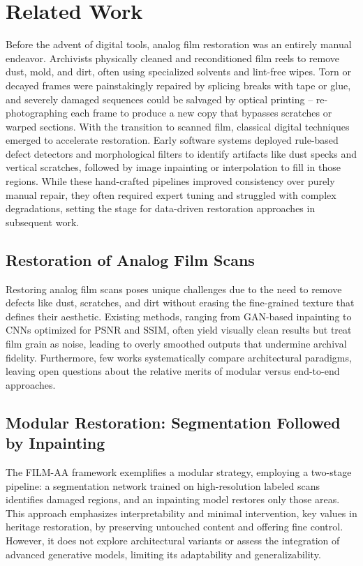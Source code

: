\documentclass[10pt,a4paper,twocolumn,twoside]{article}
\begin{document}
\section{Related Work}
Before the advent of digital tools, analog film restoration was an entirely manual endeavor. Archivists physically cleaned and reconditioned film reels to remove dust, mold, and dirt, often using specialized solvents and lint-free wipes. Torn or decayed frames were painstakingly repaired by splicing breaks with tape or glue, and severely damaged sequences could be salvaged by optical printing – re-photographing each frame to produce a new copy that bypasses scratches or warped sections. With the transition to scanned film, classical digital techniques emerged to accelerate restoration. Early software systems deployed rule-based defect detectors and morphological filters to identify artifacts like dust specks and vertical scratches, followed by image inpainting or interpolation to fill in those regions. While these hand-crafted pipelines improved consistency over purely manual repair, they often required expert tuning and struggled with complex degradations, setting the stage for data-driven restoration approaches in subsequent work. \cite{croci2015advanced}

\subsection{Restoration of Analog Film Scans}
Restoring analog film scans poses unique challenges due to the need to remove defects like dust, scratches, and dirt without erasing the fine-grained texture that defines their aesthetic. Existing methods, ranging from GAN-based inpainting \cite{gan} to CNNs optimized for PSNR and SSIM, often yield visually clean results but treat film grain as noise, leading to overly smoothed outputs that undermine archival fidelity. Furthermore, few works systematically compare architectural paradigms, leaving open questions about the relative merits of modular versus end-to-end approaches. \cite{survey} \\ 
\subsection{Modular Restoration: Segmentation Followed by Inpainting}
The FILM-AA framework exemplifies a modular strategy, employing a two-stage pipeline: a segmentation network trained on high-resolution labeled scans identifies damaged regions, and an inpainting model restores only those areas. This approach emphasizes interpretability and minimal intervention, key values in heritage restoration, by preserving untouched content and offering fine control. However, it does not explore architectural variants or assess the integration of advanced generative models, limiting its adaptability and generalizability.\\
\end{document}
